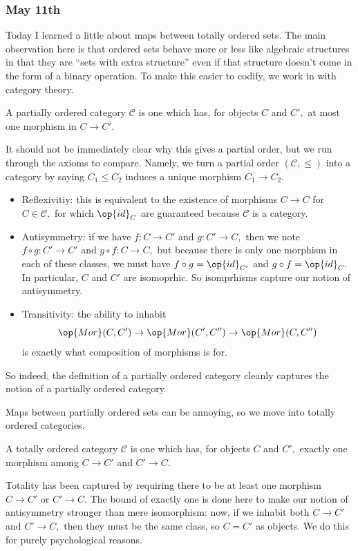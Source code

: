 \subsubsection{May 11th}
Today I learned a little about maps between totally ordered sets. The main observation here is that ordered sets behave more or less like algebraic structures in that they are ``sets with extra structure'' even if that structure doesn't come in the form of a binary operation. To make this easier to codify, we work in with category theory.
\begin{definition}
    A partially ordered category $\mathcal C$ is one which has, for objects $C$ and $C',$ at most one morphism in $C\to C'.$
\end{definition}
It should not be immediately clear why this gives a partial order, but we run through the axioms to compare. Namely, we turn a partial order $(\mathcal C,\le)$ into a category by saying $C_1\le C_2$ induces a unique morphism $C_1\to C_2.$
\begin{itemize}
    \item Reflexivitiy: this is equivalent to the existence of morphisms $C\to C$ for $C\in\mathcal C,$ for which $\op{id}_C$ are guaranteed because $\mathcal C$ is a category.
    \item Antisymmetry: if we have $f:C\to C'$ and $g:C'\to C,$ then we note $f\circ g:C'\to C'$ and $g\circ f:C\to C,$ but because there is only one morphism in each of these classes, we must have $f\circ g=\op{id}_{C'}$ and $g\circ f=\op{id}_C.$ In particular, $C$ and $C'$ are isomoprhic. So isomprhisms capture our notion of antisymmetry.
    \item Transitivity: the ability to inhabit
    \[\op{Mor}(C,C')\to\op{Mor}(C',C'')\to\op{Mor}(C,C'')\]
    is exactly what composition of morphisms is for.
\end{itemize}
So indeed, the definition of a partially ordered category cleanly captures the notion of a partially ordered category.

Maps between partially ordered sets can be annoying, so we move into totally ordered categories.
\begin{definition}
    A totally ordered category $\mathcal C$ is one which has, for objects $C$ and $C',$ exactly one morphism among $C\to C'$ and $C'\to C.$
\end{definition}
Totality has been captured by requiring there to be at least one morphism $C\to C'$ or $C'\to C.$ The bound of exactly one is done here to make our notion of antisymmetry stronger than mere isomorphism: now, if we inhabit both $C\to C'$ and $C'\to C,$ then they must be the same class, so $C=C'$ as objects. We do this for purely psychological reasons.

